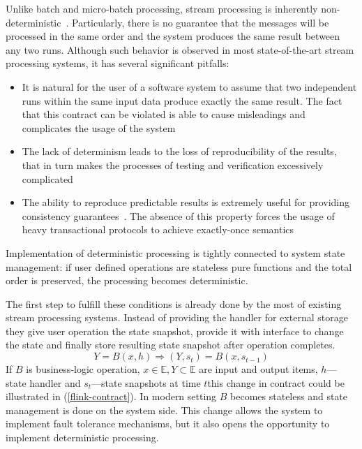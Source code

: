 
Unlike batch and micro-batch processing, stream processing is inherently non-deterministic~\cite{Zaharia:2012:DSE:2342763.2342773}. Particularly, there is no guarantee that the messages will be processed in the same order and the system produces the same result between any two runs. Although such behavior is observed in most state-of-the-art stream processing systems, it has several significant pitfalls:

\begin{itemize}
    \item It is natural for the user of a software system to assume that two independent runs within the same input data produce exactly the same result. The fact that this contract can be violated is able to cause misleadings and complicates the usage of the system
    \item The lack of determinism leads to the loss of reproducibility of the results, that in turn makes the processes of testing and verification excessively complicated
    \item The ability to reproduce predictable results is extremely useful for providing consistency guarantees~\cite{Stonebraker:2005:RRS:1107499.1107504}. The absence of this property forces the usage of heavy transactional protocols to achieve exactly-once semantics~\cite{Carbone:2017:SMA:3137765.3137777, jacques2016consistent} 
\end{itemize}

Implementation of deterministic processing is tightly connected to system state management: if user defined operations are stateless pure functions and the total order is preserved, the processing becomes deterministic.

The first step to fulfill these conditions is already done by the most of existing stream processing systems. Instead of providing the handler for external storage they give user operation the state snapshot, provide it with interface to change the state and finally store resulting state snapshot after operation completes.
\begin{equation}
\label{flink-contract}
Y = B(x, h) \Rightarrow (Y, s_t) = B(x, s_{t-1}) 
\end{equation}
If $B$ is business-logic operation, $x \in \mathbb{E}, Y \subset \mathbb{E}$ are input and output items, $h$---state handler and $s_t$---state snapshots at time $t$this change in contract could be illustrated in (\ref{flink-contract}). In modern setting $B$ becomes stateless and state management is done on the system side. This change allows the system to implement fault tolerance mechanisms, but it also opens the opportunity to implement deterministic processing. 

